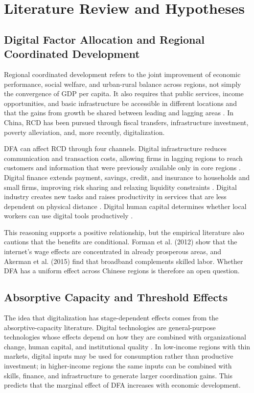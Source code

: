 \section{Literature Review and Hypotheses}\label{sec:lit}

\subsection{Digital Factor Allocation and Regional Coordinated Development}

Regional coordinated development refers to the joint improvement of economic performance, social welfare, and urban-rural balance across regions, not simply the convergence of GDP per capita. It also requires that public services, income opportunities, and basic infrastructure be accessible in different locations and that the gains from growth be shared between leading and lagging areas \citep{kanbur2005,worldbank2009}. In China, RCD has been pursued through fiscal transfers, infrastructure investment, poverty alleviation, and, more recently, digitalization.

DFA can affect RCD through four channels. Digital infrastructure reduces communication and transaction costs, allowing firms in lagging regions to reach customers and information that were previously available only in core regions \citep{czernich2011,hjort2019}. Digital finance extends payment, savings, credit, and insurance to households and small firms, improving risk sharing and relaxing liquidity constraints \citep{jack2014,beck2007,liu2023}. Digital industry creates new tasks and raises productivity in services that are less dependent on physical distance \citep{goldfarb2019,acemoglu2011}. Digital human capital determines whether local workers can use digital tools productively \citep{akerman2015,vandijk2005}.

This reasoning supports a positive relationship, but the empirical literature also cautions that the benefits are conditional. Forman et al. (2012) show that the internet's wage effects are concentrated in already prosperous areas, and Akerman et al. (2015) find that broadband complements skilled labor. Whether DFA has a uniform effect across Chinese regions is therefore an open question.

\subsection{Absorptive Capacity and Threshold Effects}

The idea that digitalization has stage-dependent effects comes from the absorptive-capacity literature. Digital technologies are general-purpose technologies whose effects depend on how they are combined with organizational change, human capital, and institutional quality \citep{brynjolfsson2014,omahony2005}. In low-income regions with thin markets, digital inputs may be used for consumption rather than productive investment; in higher-income regions the same inputs can be combined with skills, finance, and infrastructure to generate larger coordination gains. This predicts that the marginal effect of DFA increases with economic development.

